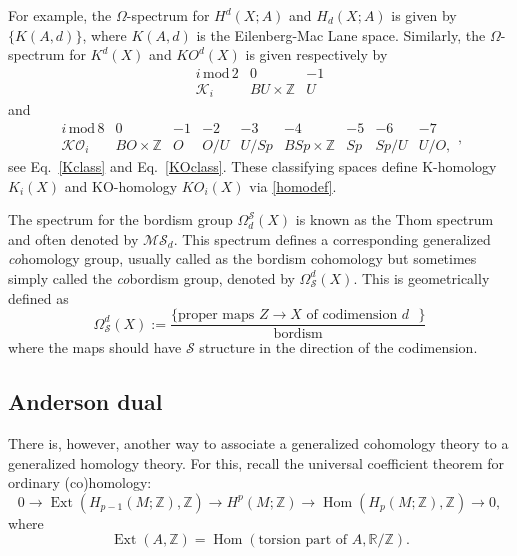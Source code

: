 \documentclass[12pt]{article}
\numberwithin{equation}{section}
\numberwithin{figure}{section}
\theoremstyle{remark}
\def\bR{\mathbb{R}}
\def\bZ{\mathbb{Z}}
\def\cS{\mathcal{S}}
\def\Hom{\mathop{\mathrm{Hom}}}
\def\Ext{\mathop{\mathrm{Ext}}}
\begin{document}
For example, the $\Omega$-spectrum for $H^d(X;A)$ and $H_d(X;A)$ is given by $\{ K(A,d)\}$,
where $K(A,d)$ is the Eilenberg-Mac Lane space.
Similarly, the $\Omega$-spectrum for $K^d(X)$ and $KO^d(X)$ is given respectively by \begin{equation}
\begin{array}{c|cc}
i\,\text{mod}\, 2 & 0 & -1 \\
\hline
\mathcal{K}_i & BU \times \bZ & U
\end{array}
\end{equation}
and
\begin{equation}
\begin{array}{c|cccccccc}
i\,\text{mod}\, 8 & 0 & -1 & -2 & -3 & -4 & -5& -6 & -7\\
\hline
\mathcal{KO}_i & BO \times \bZ & O & O/U & U/Sp & BSp\times \bZ & Sp & Sp/U & U/O,
\end{array},
\end{equation}
see Eq.~\ref{Kclass} and Eq.~\ref{KOclass}.
These classifying spaces define K-homology $K_i(X)$ and KO-homology $KO_i(X)$ via \eqref{homodef}.

The spectrum for the bordism group $\Omega^\cS_d(X)$ 
is known as the Thom spectrum and often denoted by $\mathcal{MS}_d$.
This spectrum defines a corresponding generalized \emph{co}homology group,
usually called as the bordism cohomology but sometimes simply called the \emph{co}bordism group, 
denoted by $\Omega_\cS^d(X)$. 
This is geometrically defined as \begin{equation}
\Omega_\cS^d(X):= \frac{ \{ \text{proper maps $Z\to X$ of codimension $d$   } \}}{ \text{bordism}}
\end{equation} where the maps should have $\cS$ structure in the direction of the codimension.


\subsection{Anderson dual}

There is, however, another way to associate a generalized cohomology theory to 
a generalized homology theory. For this, recall the universal coefficient theorem for ordinary (co)homology:
\begin{equation}
0\to \Ext(H_{p-1}(M;\bZ),\bZ) \to H^p(M;\bZ) \to \Hom(H_p(M;\bZ),\bZ) \to 0,
\label{univ}
\end{equation} where \begin{equation}
\Ext(A,\bZ) = \Hom(\text{torsion part of $A$}, \bR/\bZ).
\end{equation}
\end{document}
